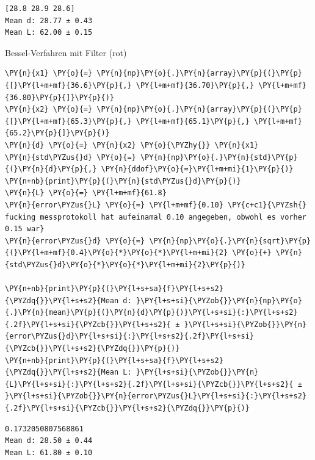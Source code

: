     \begin{Verbatim}[commandchars=\\\{\}]
[28.8 28.9 28.6]
Mean d: 28.77 ± 0.43
Mean L: 62.00 ± 0.15
    \end{Verbatim}

    Bessel-Verfahren mit Filter (rot)

    \begin{tcolorbox}[breakable, size=fbox, boxrule=1pt, pad at break*=1mm,colback=cellbackground, colframe=cellborder]
\begin{Verbatim}[commandchars=\\\{\}]
\PY{n}{x1} \PY{o}{=} \PY{n}{np}\PY{o}{.}\PY{n}{array}\PY{p}{(}\PY{p}{[}\PY{l+m+mf}{36.6}\PY{p}{,} \PY{l+m+mf}{36.70}\PY{p}{,} \PY{l+m+mf}{36.80}\PY{p}{]}\PY{p}{)}
\PY{n}{x2} \PY{o}{=} \PY{n}{np}\PY{o}{.}\PY{n}{array}\PY{p}{(}\PY{p}{[}\PY{l+m+mf}{65.3}\PY{p}{,} \PY{l+m+mf}{65.1}\PY{p}{,} \PY{l+m+mf}{65.2}\PY{p}{]}\PY{p}{)}
\PY{n}{d} \PY{o}{=} \PY{n}{x2} \PY{o}{\PYZhy{}} \PY{n}{x1}
\PY{n}{std\PYZus{}d} \PY{o}{=} \PY{n}{np}\PY{o}{.}\PY{n}{std}\PY{p}{(}\PY{n}{d}\PY{p}{,} \PY{n}{ddof}\PY{o}{=}\PY{l+m+mi}{1}\PY{p}{)}
\PY{n+nb}{print}\PY{p}{(}\PY{n}{std\PYZus{}d}\PY{p}{)}
\PY{n}{L} \PY{o}{=} \PY{l+m+mf}{61.8}
\PY{n}{error\PYZus{}L} \PY{o}{=} \PY{l+m+mf}{0.10} \PY{c+c1}{\PYZsh{} fucking messprotokoll hat aufeinamal 0.10 angegeben, obwohl es vorher 0.15 war}
\PY{n}{error\PYZus{}d} \PY{o}{=} \PY{n}{np}\PY{o}{.}\PY{n}{sqrt}\PY{p}{(}\PY{l+m+mf}{0.4}\PY{o}{*}\PY{o}{*}\PY{l+m+mi}{2} \PY{o}{+} \PY{n}{std\PYZus{}d}\PY{o}{*}\PY{o}{*}\PY{l+m+mi}{2}\PY{p}{)}

\PY{n+nb}{print}\PY{p}{(}\PY{l+s+sa}{f}\PY{l+s+s2}{\PYZdq{}}\PY{l+s+s2}{Mean d: }\PY{l+s+si}{\PYZob{}}\PY{n}{np}\PY{o}{.}\PY{n}{mean}\PY{p}{(}\PY{n}{d}\PY{p}{)}\PY{l+s+si}{:}\PY{l+s+s2}{.2f}\PY{l+s+si}{\PYZcb{}}\PY{l+s+s2}{ ± }\PY{l+s+si}{\PYZob{}}\PY{n}{error\PYZus{}d}\PY{l+s+si}{:}\PY{l+s+s2}{.2f}\PY{l+s+si}{\PYZcb{}}\PY{l+s+s2}{\PYZdq{}}\PY{p}{)}
\PY{n+nb}{print}\PY{p}{(}\PY{l+s+sa}{f}\PY{l+s+s2}{\PYZdq{}}\PY{l+s+s2}{Mean L: }\PY{l+s+si}{\PYZob{}}\PY{n}{L}\PY{l+s+si}{:}\PY{l+s+s2}{.2f}\PY{l+s+si}{\PYZcb{}}\PY{l+s+s2}{ ± }\PY{l+s+si}{\PYZob{}}\PY{n}{error\PYZus{}L}\PY{l+s+si}{:}\PY{l+s+s2}{.2f}\PY{l+s+si}{\PYZcb{}}\PY{l+s+s2}{\PYZdq{}}\PY{p}{)}
\end{Verbatim}
\end{tcolorbox}

    \begin{Verbatim}[commandchars=\\\{\}]
0.1732050807568861
Mean d: 28.50 ± 0.44
Mean L: 61.80 ± 0.10
    \end{Verbatim}

